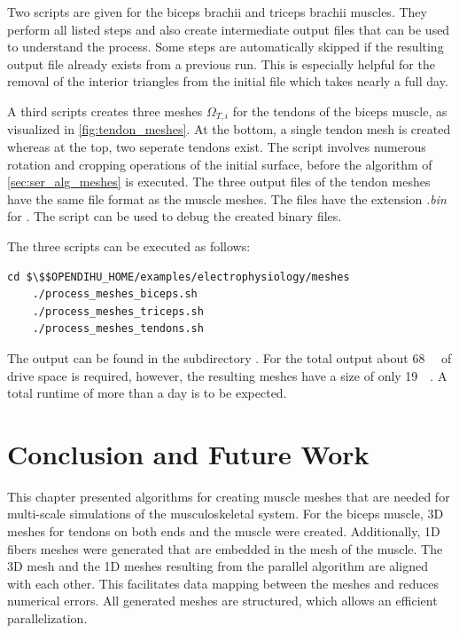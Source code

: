 \begin{reproduce}
  Two scripts are given for the biceps brachii and triceps brachii muscles. They perform all listed steps and also create intermediate output files that can be used to understand the process. Some steps are automatically skipped if the resulting output file already exists from a previous run. This is especially helpful for the removal of the interior triangles from the initial file which takes nearly a full day.
  
  A third scripts creates three meshes $\Omega_{T,i}$ for the tendons of the biceps muscle, as visualized in \cref{fig:tendon_meshes}. At the bottom, a single tendon mesh is created whereas at the top, two seperate tendons exist. The script involves numerous rotation and cropping operations of the initial surface, before the algorithm of \cref{sec:ser_alg_meshes} is executed. The three output files of the tendon meshes have the same file format as the muscle meshes. The files have the extension \emph{.bin} for . The script  can be used to debug the created binary files.
  
  The three scripts can be executed as follows:
  \begin{lstlisting}[columns=fullflexible,breaklines=true,postbreak=\mbox{\textcolor{gray}{$\hookrightarrow$}\space}]
    cd $\$$OPENDIHU_HOME/examples/electrophysiology/meshes
    ./process_meshes_biceps.sh
    ./process_meshes_triceps.sh
    ./process_meshes_tendons.sh
  \end{lstlisting}
  The output can be found in the subdirectory . For the total output about \SI{68}{\gibi\byte} of drive space is required, however, the resulting meshes have a size of only \SI{19}{\gibi\byte}. A total runtime of more than a day is to be expected.
  
\end{reproduce}

\section{Conclusion and Future Work}\label{sec:meshes_summary_and_conclusion}

This chapter presented algorithms for creating muscle meshes that are needed for multi-scale simulations of the musculoskeletal system.
For the biceps muscle, 3D meshes for tendons on both ends and the muscle were created. Additionally, 1D fibers meshes were generated that are embedded in the mesh of the muscle. The 3D mesh and the 1D meshes resulting from the parallel algorithm are aligned with each other. This facilitates data mapping between the meshes and reduces numerical errors. All generated meshes are structured, which allows an efficient parallelization.

